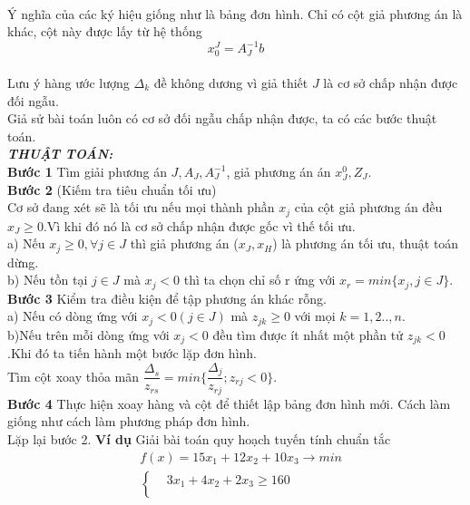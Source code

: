 \documentclass[12pt,a4paper]{report}
\begin{document}
\begin{itemize}
\begin{tabular}{|c|c|c|c|c|c|c|c|c|}
    \end{tabular}\\
    Ý nghĩa của các ký hiệu giống như là bảng đơn hình. Chỉ có cột giả phương án là khác, cột này được lấy từ hệ thống \\
    $$x_0^J=A_J^{-1}b$$\\
    Lưu ý hàng ước lượng $\Delta_k$ đề không dương vì giả thiết $J$ là cơ sở chấp nhận được đối ngẫu.\\ 
    Giả sử bài toán luôn có cơ sở đối ngẫu chấp nhận được, ta có các bước thuật toán.\\
    \textbf{\textit{THUẬT TOÁN:}}\\
    \textbf{Bước 1} Tìm giải phương án $J,A_J, A_J^{-1}$, giả phương án án $x_J^0,Z_J.$\\
    \textbf{Bước 2} (Kiếm tra tiêu chuẩn tối ưu)\\
    Cơ sở đang xét sẽ là tối ưu nếu mọi thành phần $x_j$ của cột giả phương án đều $x_J \ge 0$.Vì khi đó nó là cơ sở chấp nhận được gốc vì thế tối ưu.\\
    a) Nếu $x_j\ge 0, \forall j \in J$ thì giả phương án ($x_J,x_H$) là phương án tối ưu, thuật toán dừng.\\
    b) Nếu tồn tại $j \in J$ mà $x_j <0 $ thì ta chọn chỉ số r ứng với \textbf{$x_r=min \{x_j, j \in J\}$}.\\ 
    \textbf{Bước 3} Kiểm tra điều kiện để tập phương án khác rỗng.\\
    a) Nếu có dòng ứng với $x_j <0 (j \in J)$ mà $z_{jk}\ge 0 $ với mọi $k=1,2..,n$.\\
    b)Nếu trên mỗi dòng ứng với $x_j <0$ đều tìm được ít nhất một phần tử $z_{jk} <0$.Khi đó ta tiến hành một bước lặp đơn hình.\\
    Tìm cột xoay thỏa mãn $\dfrac{\Delta_s}{z_{rs}}=min \{\dfrac{\Delta_j}{z_{rj}}; z_{rj} <0\}$.\\
    \textbf{Bước 4} Thực hiện xoay hàng và cột để thiết lập bảng đơn hình mới. Cách làm giống như cách làm phương pháp đơn hình.\\
    Lặp lại bước 2.
    \textbf{Ví dụ }
         Giải bài toán quy hoạch tuyến tính chuẩn tắc\\
    \begin{equation*}
        \begin{split}
            &f(x)=15x_1+12x_2+10x_3 \longrightarrow min\\
            & \left\{\begin{split}
                &3x_1+4x_2+2x_3 \ge 160\\

\end{split}
\end{split}
\end{equation*}
\end{itemize}
\end{document}
